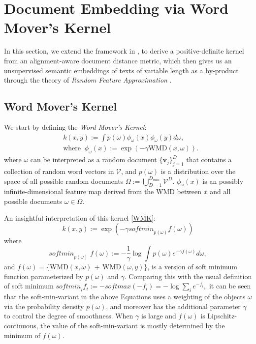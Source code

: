 \documentclass[11pt,a4paper]{article}
\newcommand{\V}{\mathcal{V}}
\newcommand{\1}{\boldsymbol{1}}
\newcommand{\bv}{\boldsymbol{v}}
\newcommand{\WMD}{\text{WMD}}
\newcommand{\softmin}{\mathit{softmin}}
\newcommand{\softmax}{\mathit{softmax}}
\begin{document}
\section{Document Embedding via Word Mover's Kernel}

In this section, we extend the framework in \cite{wu2018d2ke}, to derive a positive-definite kernel from an alignment-aware document distance metric, which then gives us an unsupervised semantic embeddings of texts of variable length as a by-product through the theory of \emph{Random Feature Approximation} \cite{rahimi2007random}.

\subsection{Word Mover's Kernel}
We start by defining the \emph{Word Mover's Kernel}:
\begin{equation}\label{WMK}
\begin{aligned}
& k(x,y):=  \int p(\omega) \phi_{\omega}(x)\phi_{\omega}(y) d\omega, \\
& \text{where} \;\; \phi_{\omega}(x):=\exp(-\gamma \WMD(x,\omega)).
\end{aligned}
\end{equation}
where $\omega$ can be interpreted as a random document $\{\bv_j\}_{j=1}^D$ that contains a collection of random word vectors in $\V$, and $p(\omega)$ is a distribution over the space of all possible random documents $\Omega:=\bigcup_{D=1}^{D_{max}}\V^{D}$. $\phi_{\omega}(x)$ is an possibly infinite-dimensional feature map derived from the WMD between $x$ and all possible documents $\omega\in\Omega$.

An insightful interpretation of this kernel \eqref{WMK}:
\begin{equation*}\label{D2K2}
k(x,y):= \exp ( -\gamma\softmin_{p(\omega)} f(\omega) )
\end{equation*}
where
\begin{equation*}\label{softmin}
\softmin_{p(\omega)}\;f(\omega):= -\frac{1}{\gamma}\log \int p(\omega) e^{-\gamma f(\omega)} d\omega,
\end{equation*}
and 
$f(\omega) = \{ \WMD(x,\omega)\,+\,\WMD(\omega,y) \}$,
is a version of soft minimum function parameterized by $p(\omega)$ and $\gamma$. Comparing this with the usual definition of soft minimum
$
\softmin_i f_i := -\softmax(-f_i) = -\log \sum_{i} e^{-f_i},
$
it can be seen that the soft-min-variant in the above Equations uses a weighting of the objects $\omega$ via the probability density $p(\omega)$, and moreover has the additional parameter $\gamma$ to control the degree of smoothness. When $\gamma$ is large and $f(\omega)$ is Lipschitz-continuous, the value of the soft-min-variant is mostly determined by the minimum of $f(\omega)$. 
\end{document}
